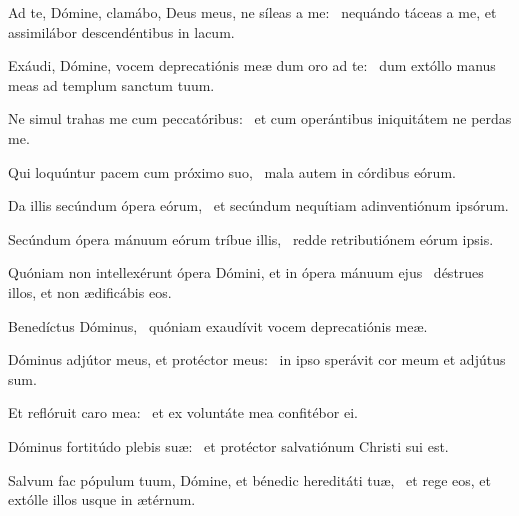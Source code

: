 \item Ad te, Dómine, clamábo, Deus meus, ne síleas a me:~\psstar{} nequándo táceas a me, et assimilábor descendéntibus in lacum.

\item Exáudi, Dómine, vocem deprecatiónis meæ dum oro ad te:~\psstar{} dum extóllo manus meas ad templum sanctum tuum.

\item Ne simul trahas me cum peccatóribus:~\psstar{} et cum operántibus iniquitátem ne perdas me.

\item Qui loquúntur pacem cum próximo suo,~\psstar{} mala autem in córdibus eórum.

\item Da illis secúndum ópera eórum,~\psstar{} et secúndum nequítiam adinventiónum ipsórum.

\item Secúndum ópera mánuum eórum tríbue illis,~\psstar{} redde retributiónem eórum ipsis.

\item Quóniam non intellexérunt ópera Dómini, et in ópera mánuum ejus~\psstar{} déstrues illos, et non ædificábis eos.

\item Benedíctus Dóminus,~\psstar{} quóniam exaudívit vocem deprecatiónis meæ.

\item Dóminus adjútor meus, et protéctor meus:~\psstar{} in ipso sperávit cor meum et adjútus sum.

\item Et reflóruit caro mea:~\psstar{} et ex voluntáte mea confitébor ei.

\item Dóminus fortitúdo plebis suæ:~\psstar{} et protéctor salvatiónum Christi sui est.

\item Salvum fac pópulum tuum, Dómine, et bénedic hereditáti tuæ,~\psstar{} et rege eos, et extólle illos usque in ætérnum.